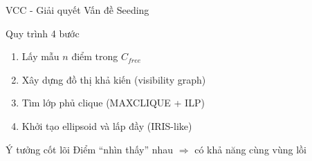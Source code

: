 \documentclass[aspectratio=169]{beamer}
\begin{document}
\begin{frame}{VCC - Giải quyết Vấn đề Seeding}
    \begin{block}{Quy trình 4 bước}
        \begin{enumerate}
            \item Lấy mẫu $n$ điểm trong $C_{free}$
            \item Xây dựng đồ thị khả kiến (visibility graph)
            \item Tìm lớp phủ clique (MAXCLIQUE + ILP)
            \item Khởi tạo ellipsoid và lấp đầy (IRIS-like)
        \end{enumerate}
    \end{block}

    \begin{block}{Ý tưởng cốt lõi}
        Điểm ``nhìn thấy'' nhau $\Rightarrow$ có khả năng cùng vùng lồi
    \end{block}
\end{frame}
\end{document}
